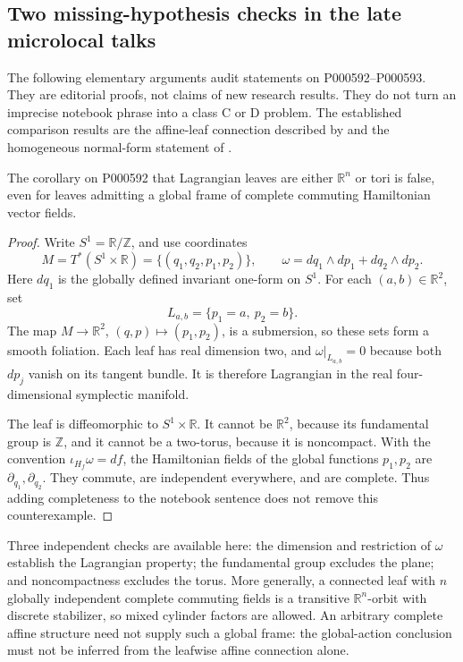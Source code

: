 \subsection{Two missing-hypothesis checks in the late microlocal talks}

The following elementary arguments audit statements on P000592--P000593.
They are editorial proofs, not claims of new research results. They do not
turn an imprecise notebook phrase into a class C or D problem. The
established comparison results are the affine-leaf connection described by
\citet[Proposition 1.9 and Theorem 1.10]{loustausanders2017bilagrangian}
and the homogeneous normal-form statement of
\citet[Proposition 6.1.4]{duistermaathormander1972fourierii}.

\begin{proposition}\leavevmode\par\noindent\ours\quad
The corollary on P000592 that Lagrangian leaves are either
\(\mathbb R^n\) or tori is false, even for leaves admitting a global
frame of complete commuting Hamiltonian vector fields.
\end{proposition}

\begin{proof}
Write \(S^1=\mathbb R/\mathbb Z\), and use coordinates
\[
 M=T^*(S^1\times\mathbb R)
   =\{(q_1,q_2,p_1,p_2)\},\qquad
 \omega=dq_1\wedge dp_1+dq_2\wedge dp_2 .
\]
Here \(dq_1\) is the globally defined invariant one-form on \(S^1\).
For each \((a,b)\in\mathbb R^2\), set
\[
 L_{a,b}=\{p_1=a,\ p_2=b\}.
\]
The map \(M\to\mathbb R^2\), \((q,p)\mapsto(p_1,p_2)\), is a
submersion, so these sets form a smooth foliation. Each leaf has real
dimension two, and \(\omega|_{L_{a,b}}=0\) because both \(dp_j\) vanish
on its tangent bundle. It is therefore Lagrangian in the real
four-dimensional symplectic manifold.

The leaf is diffeomorphic to \(S^1\times\mathbb R\). It cannot be
\(\mathbb R^2\), because its fundamental group is \(\mathbb Z\), and
it cannot be a two-torus, because it is noncompact. With the convention
\(\iota_{H_f}\omega=df\), the Hamiltonian fields of the global functions
\(p_1,p_2\) are \(\partial_{q_1},\partial_{q_2}\). They commute, are
independent everywhere, and are complete. Thus adding completeness to
the notebook sentence does not remove this counterexample.
\end{proof}

\begin{remark}
Three independent checks are available here: the dimension and
restriction of \(\omega\) establish the Lagrangian property; the
fundamental group excludes the plane; and noncompactness excludes the
torus. More generally, a connected leaf with \(n\) globally independent
complete commuting fields is a transitive \(\mathbb R^n\)-orbit with
discrete stabilizer, so mixed cylinder factors are allowed. An
arbitrary complete affine structure need not supply such a global frame:
the global-action conclusion must not be inferred from the
leafwise affine connection alone.
\end{remark}

